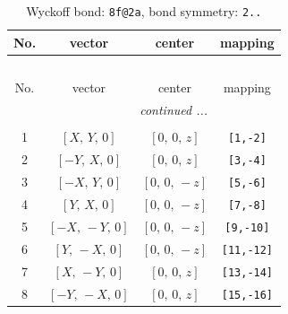 \documentclass[fleqn,8pt]{jsarticle}
\begin{document}
\begin{longtable}{cccc}
\caption{Wyckoff bond: {\tt 8f@2a}, bond symmetry: {\tt 2..}}
 \\
 \hline \hline
No. & vector & center & mapping \\ \hline \endfirsthead

\multicolumn{3}{l}{\tablename\ \thetable{}} \\
 \hline \hline
No. & vector & center & mapping \\ \hline \endhead

 \hline \hline
\multicolumn{3}{r}{\footnotesize\it continued ...} \\ \endfoot

 \hline \hline
\multicolumn{3}{r}{} \\ \endlastfoot

1 & $\left[ X,\, Y,\, 0 \right]$ & $\left[ 0,\, 0,\, z \right]$ & {\tt [1,-2]} \\ \hline
2 & $\left[ - Y,\, X,\, 0 \right]$ & $\left[ 0,\, 0,\, z \right]$ & {\tt [3,-4]} \\ \hline
3 & $\left[ - X,\, Y,\, 0 \right]$ & $\left[ 0,\, 0,\, - z \right]$ & {\tt [5,-6]} \\ \hline
4 & $\left[ Y,\, X,\, 0 \right]$ & $\left[ 0,\, 0,\, - z \right]$ & {\tt [7,-8]} \\ \hline
5 & $\left[ - X,\, - Y,\, 0 \right]$ & $\left[ 0,\, 0,\, - z \right]$ & {\tt [9,-10]} \\ \hline
6 & $\left[ Y,\, - X,\, 0 \right]$ & $\left[ 0,\, 0,\, - z \right]$ & {\tt [11,-12]} \\ \hline
7 & $\left[ X,\, - Y,\, 0 \right]$ & $\left[ 0,\, 0,\, z \right]$ & {\tt [13,-14]} \\ \hline
8 & $\left[ - Y,\, - X,\, 0 \right]$ & $\left[ 0,\, 0,\, z \right]$ & {\tt [15,-16]} \\
\end{longtable}
\renewcommand{\arraystretch}{1.2}
\end{document}
